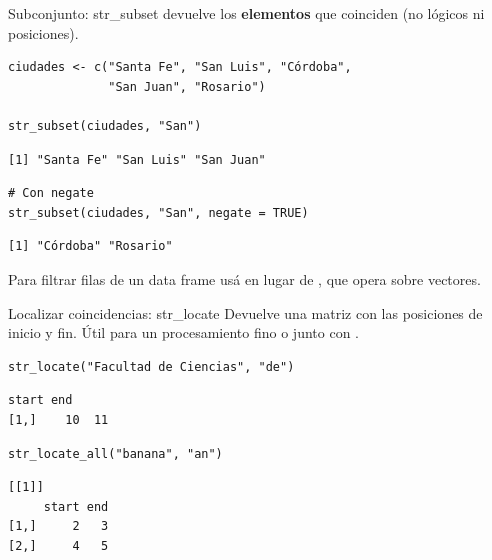 \documentclass[8pt]{beamer}
\begin{document}
\begin{frame}[fragile]{Subconjunto: str\_subset}
	 devuelve los \textbf{elementos} que coinciden (no lógicos ni posiciones).
\begin{lstlisting}[style=RScript]
ciudades <- c("Santa Fe", "San Luis", "Córdoba",
              "San Juan", "Rosario")

str_subset(ciudades, "San")
\end{lstlisting}
\begin{lstlisting}[style=RConsole]
[1] "Santa Fe" "San Luis" "San Juan"
\end{lstlisting}
\begin{lstlisting}[style=RScript]
# Con negate
str_subset(ciudades, "San", negate = TRUE)
\end{lstlisting}
\begin{lstlisting}[style=RConsole]
[1] "Córdoba" "Rosario"
\end{lstlisting}

	\begin{alertblock}{}
		Para filtrar filas de un data frame usá  en lugar de , que opera sobre vectores.
	\end{alertblock}
\end{frame}




\begin{frame}[fragile]{Localizar coincidencias: str\_locate}
	Devuelve una matriz con las posiciones de inicio y fin. Útil para un procesamiento fino o junto con .
	
\begin{lstlisting}[style=RScript]
str_locate("Facultad de Ciencias", "de")
\end{lstlisting}
\begin{lstlisting}[style=RConsole]
     start end
[1,]    10  11
\end{lstlisting}

\begin{lstlisting}[style=RScript]
str_locate_all("banana", "an")
\end{lstlisting}
\begin{lstlisting}[style=RConsole]
[[1]]
     start end
[1,]     2   3
[2,]     4   5
\end{lstlisting}
\end{frame}
\end{document}
